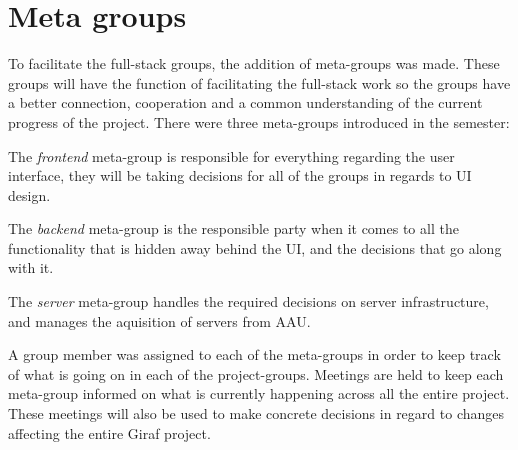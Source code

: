 \section{Meta groups}
To facilitate the full-stack groups, the addition of meta-groups was made.
These groups will have the function of facilitating the full-stack work so the groups have a better connection, cooperation and a common understanding of the current progress of the project.
There were three meta-groups introduced in the semester:

The \textit{frontend} meta-group is responsible for everything regarding the user interface, they will be taking decisions for all of the groups in regards to UI design.

The \textit{backend} meta-group is the responsible party when it comes to all the functionality that is hidden away behind the UI, and the decisions that go along with it.

The \textit{server} meta-group handles the required decisions on server infrastructure, and manages the aquisition of servers from AAU.

A group member was assigned to each of the meta-groups in order to keep track of what is going on in each of the project-groups. Meetings are held to keep each meta-group informed on what is currently happening across all the entire project. These meetings will also be used to make concrete decisions in regard to changes affecting the entire Giraf project.
